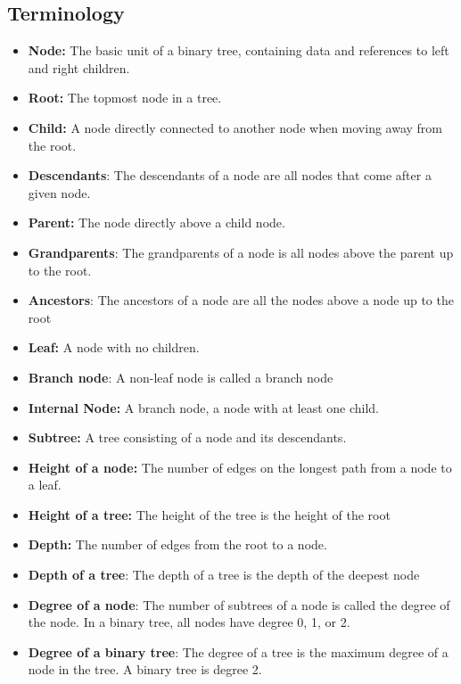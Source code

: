 \documentclass{report}
\begin{document}
\subsection{Terminology}
\bigbreak \noindent 
\begin{itemize}
    \item \textbf{Node:} The basic unit of a binary tree, containing data and references to left and right children.
    \item \textbf{Root:} The topmost node in a tree.
    \item \textbf{Child:} A node directly connected to another node when moving away from the root.
    \item \textbf{Descendants}: The descendants of a node are all nodes that come after a given node.
    \item \textbf{Parent:} The node directly above a child node.
    \item \textbf{Grandparents}: The grandparents of a node is all nodes above the parent up to the root.
    \item \textbf{Ancestors}: The ancestors of a node are all the nodes above a node up to the root
    \item \textbf{Leaf:} A node with no children.
    \item \textbf{Branch node}: A non-leaf node is called a branch node
    \item \textbf{Internal Node:} A branch node, a node with at least one child.
    \item \textbf{Subtree:} A tree consisting of a node and its descendants.
    \item \textbf{Height of a node:} The number of edges on the longest path from a node to a leaf.
    \item \textbf{Height of a tree:} The height of the tree is the height of the root
    \item \textbf{Depth:} The number of edges from the root to a node.
    \item \textbf{Depth of a tree}: The depth of a tree is the depth of the deepest node
    \item \textbf{Degree of a node}: The number of subtrees of a node is called the degree of the node. In a binary tree, all nodes have degree 0, 1, or 2.
    \item \textbf{Degree of a binary tree}:   The degree of a tree is the maximum degree of a node in the tree. A binary tree is degree 2.
\end{itemize}
\end{document}
